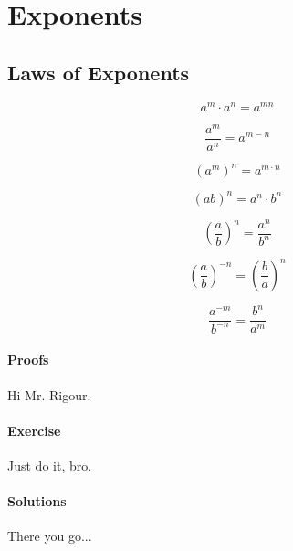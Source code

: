 \section{Exponents}

\subsection{Laws of Exponents}

$$
a^{m} \cdot a^{n} = a^{mn}
$$

$$
\frac{a^{m}}{a^{n}} = a^{m-n}
$$

$$
\left( a^{m} \right)^{n} = a^{m \cdot n}
$$

$$
\left( ab \right)^{n} = a^{n} \cdot b^{n}
$$

$$
\left( \frac{a}{b} \right) ^{n} = \frac{a^{n}}{b^{n}}
$$

$$
\left( \frac{a}{b} \right)^{-n} = \left( \frac{b}{a} \right)^{n}
$$

$$
\frac{a^{-m}}{b^{-n}} = \frac{b^{n}}{a^{m}}
$$


\paragraph{Proofs}

Hi Mr. Rigour.

\paragraph{Exercise}

Just do it, bro.

\paragraph{Solutions}

There you go...
